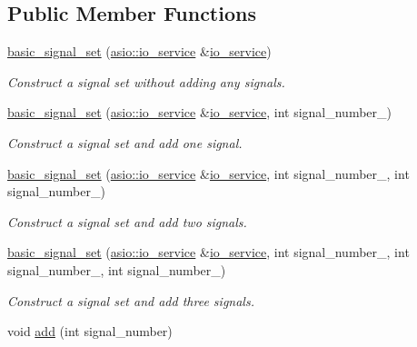 \subsection*{Public Member Functions}
\begin{DoxyCompactItemize}
\item 
\hyperlink{classasio_1_1basic__signal__set_a56a9d32afd2f071ee97bdb8896d2ba8c}{basic\+\_\+signal\+\_\+set} (\hyperlink{classasio_1_1io__service}{asio\+::io\+\_\+service} \&\hyperlink{classasio_1_1io__service}{io\+\_\+service})
\begin{DoxyCompactList}\small\item\em Construct a signal set without adding any signals. \end{DoxyCompactList}\item 
\hyperlink{classasio_1_1basic__signal__set_a9e19caf50cae10b30dd8e1ad84aed6d0}{basic\+\_\+signal\+\_\+set} (\hyperlink{classasio_1_1io__service}{asio\+::io\+\_\+service} \&\hyperlink{classasio_1_1io__service}{io\+\_\+service}, int signal\+\_\+number\+\_)
\begin{DoxyCompactList}\small\item\em Construct a signal set and add one signal. \end{DoxyCompactList}\item 
\hyperlink{classasio_1_1basic__signal__set_a5be84a31f7749fa46c4a795d2b9b74c5}{basic\+\_\+signal\+\_\+set} (\hyperlink{classasio_1_1io__service}{asio\+::io\+\_\+service} \&\hyperlink{classasio_1_1io__service}{io\+\_\+service}, int signal\+\_\+number\+\_, int signal\+\_\+number\+\_)
\begin{DoxyCompactList}\small\item\em Construct a signal set and add two signals. \end{DoxyCompactList}\item 
\hyperlink{classasio_1_1basic__signal__set_a40b87df65f27daac42541324c75470d3}{basic\+\_\+signal\+\_\+set} (\hyperlink{classasio_1_1io__service}{asio\+::io\+\_\+service} \&\hyperlink{classasio_1_1io__service}{io\+\_\+service}, int signal\+\_\+number\+\_, int signal\+\_\+number\+\_, int signal\+\_\+number\+\_)
\begin{DoxyCompactList}\small\item\em Construct a signal set and add three signals. \end{DoxyCompactList}\item 
void \hyperlink{classasio_1_1basic__signal__set_aadac531bfdbbe8b4effbda2db88aa44a}{add} (int signal\+\_\+number)

\end{DoxyCompactItemize}
